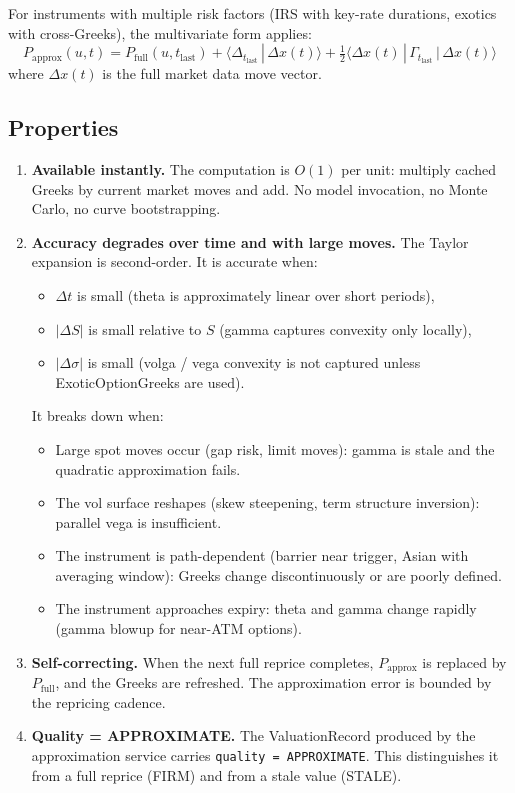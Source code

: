 \documentclass[11pt,a4paper]{article}
\begin{document}
\noindent For instruments with multiple risk factors (IRS with key-rate durations, exotics with cross-Greeks), the multivariate form applies:
\begin{equation}
\label{eq:taylor-approx-mv}
P_{\mathrm{approx}}(u, t) = P_{\mathrm{full}}(u, t_{\mathrm{last}}) + \langle \Delta_{t_{\mathrm{last}}} \,|\, \Delta x(t) \rangle + \tfrac{1}{2}\langle \Delta x(t) \,|\, \Gamma_{t_{\mathrm{last}}} \,|\, \Delta x(t) \rangle
\end{equation}
where $\Delta x(t)$ is the full market data move vector.

\subsection{Properties}

\begin{enumerate}
\item \textbf{Available instantly.}  The computation is $O(1)$ per unit: multiply cached Greeks by current market moves and add.  No model invocation, no Monte Carlo, no curve bootstrapping.

\item \textbf{Accuracy degrades over time and with large moves.}  The Taylor expansion is second-order.  It is accurate when:
\begin{itemize}[nosep]
\item $\Delta t$ is small (theta is approximately linear over short periods),
\item $|\Delta S|$ is small relative to $S$ (gamma captures convexity only locally),
\item $|\Delta\sigma|$ is small (volga / vega convexity is not captured unless ExoticOptionGreeks are used).
\end{itemize}
It breaks down when:
\begin{itemize}[nosep]
\item Large spot moves occur (gap risk, limit moves): gamma is stale and the quadratic approximation fails.
\item The vol surface reshapes (skew steepening, term structure inversion): parallel vega is insufficient.
\item The instrument is path-dependent (barrier near trigger, Asian with averaging window): Greeks change discontinuously or are poorly defined.
\item The instrument approaches expiry: theta and gamma change rapidly (gamma blowup for near-ATM options).
\end{itemize}

\item \textbf{Self-correcting.}  When the next full reprice completes, $P_{\mathrm{approx}}$ is replaced by $P_{\mathrm{full}}$, and the Greeks are refreshed.  The approximation error is bounded by the repricing cadence.

\item \textbf{Quality = APPROXIMATE.}  The ValuationRecord produced by the approximation service carries \texttt{quality = APPROXIMATE}.  This distinguishes it from a full reprice (FIRM) and from a stale value (STALE).
\end{enumerate}
\end{document}
